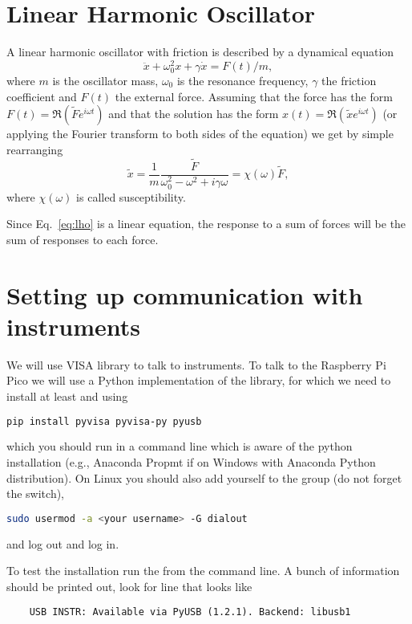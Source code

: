 \section{Linear Harmonic Oscillator}
\label{sec:lho}
A linear harmonic oscillator with friction is described by a dynamical equation
\begin{equation}
    \label{eq:lho}
    \ddot x + \omega_0^2 x + \gamma\dot x = F(t)/m,
\end{equation}
where $m$ is the oscillator mass, $\omega_0$ is the resonance frequency, $\gamma$ the friction coefficient and $F(t)$ the external force. Assuming that the force has the form $F(t) = \Re(\tilde F e^{i\omega t})$ and that the solution has the form $x(t) = \Re(\tilde x e^{i\omega t})$ (or applying the Fourier transform to both sides of the equation) we get by simple rearranging
\begin{equation}
    \tilde x = \frac{1}{m}\frac{\tilde F}{\omega_0^2 - \omega^2 + i\gamma\omega} = \chi(\omega)\tilde F,
\end{equation}
where $\chi(\omega)$ is called susceptibility.

Since Eq.~\ref{eq:lho} is a linear equation, the response to a sum of forces will be the sum of responses to each force.

\section{Setting up communication with instruments}
\label{sec:pico}
We will use VISA library to talk to instruments. To talk to the Raspberry Pi Pico we will use a Python implementation of the library, for which we need to install at least  and  using
\begin{lstlisting}[language=bash]
    pip install pyvisa pyvisa-py pyusb
\end{lstlisting}
which you should run in a command line which is aware of the python installation (e.g., Anaconda Propmt if on Windows with Anaconda Python distribution). On Linux you should also add yourself to the  group (do not forget the  switch),
\begin{lstlisting}[language=bash]
    sudo usermod -a <your username> -G dialout 
\end{lstlisting}
and log out and log in.

To test the installation run the  from the command line. A bunch of information should be printed out, look for line that looks like
\begin{lstlisting}
    USB INSTR: Available via PyUSB (1.2.1). Backend: libusb1
\end{lstlisting}

